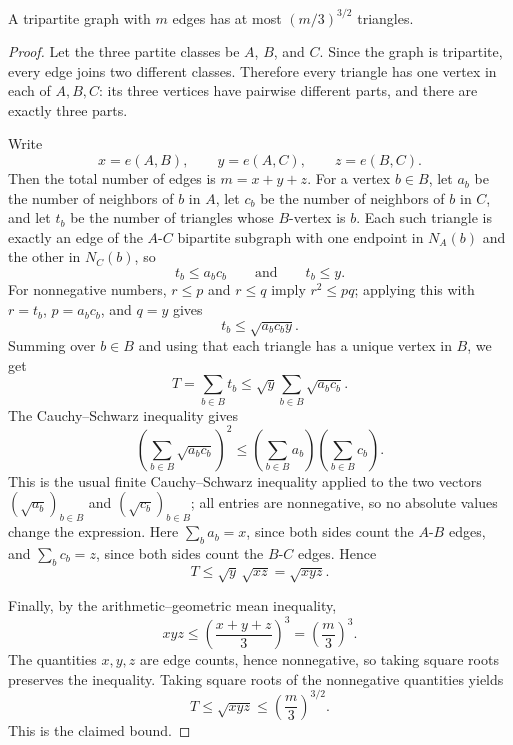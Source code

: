 \begin{lemma}
A tripartite graph with $m$ edges has at most $(m/3)^{3/2}$ triangles.
\end{lemma}
\begin{proof}
Let the three partite classes be $A$, $B$, and $C$.  Since the graph is
tripartite, every edge joins two different classes.  Therefore every triangle
has one vertex in each of $A,B,C$: its three vertices have pairwise different
parts, and there are exactly three parts.

Write
\[
x=e(A,B),\qquad y=e(A,C),\qquad z=e(B,C).
\]
Then the total number of edges is $m=x+y+z$.  For a vertex $b\in B$, let
$a_b$ be the number of neighbors of $b$ in $A$, let $c_b$ be the number of
neighbors of $b$ in $C$, and let $t_b$ be the number of triangles whose
$B$-vertex is $b$.  Each such triangle is exactly an edge of the
$A$-$C$ bipartite subgraph with one endpoint in $N_A(b)$ and the other in
$N_C(b)$, so
\[
t_b\le a_b c_b
\qquad\text{and}\qquad
t_b\le y.
\]
For nonnegative numbers, $r\le p$ and $r\le q$ imply
$r^2\le pq$; applying this with $r=t_b$, $p=a_bc_b$, and $q=y$ gives
\[
t_b\le \sqrt{a_b c_b y}.
\]
Summing over $b\in B$ and using that each triangle has a unique vertex in
$B$, we get
\[
T=\sum_{b\in B}t_b
\le \sqrt y\sum_{b\in B}\sqrt{a_b c_b}.
\]
The Cauchy--Schwarz inequality gives
\[
\left(\sum_{b\in B}\sqrt{a_b c_b}\right)^2
\le
\left(\sum_{b\in B}a_b\right)
\left(\sum_{b\in B}c_b\right).
\]
This is the usual finite Cauchy--Schwarz inequality applied to the two
vectors $(\sqrt{a_b})_{b\in B}$ and $(\sqrt{c_b})_{b\in B}$; all entries are
nonnegative, so no absolute values change the expression.
Here $\sum_b a_b=x$, since both sides count the $A$-$B$ edges, and
$\sum_b c_b=z$, since both sides count the $B$-$C$ edges.  Hence
\[
T\le \sqrt y\,\sqrt{xz}=\sqrt{xyz}.
\]

Finally, by the arithmetic--geometric mean inequality,
\[
xyz\le \left(\frac{x+y+z}{3}\right)^3=\left(\frac m3\right)^3.
\]
The quantities $x,y,z$ are edge counts, hence nonnegative, so taking square
roots preserves the inequality.
Taking square roots of the nonnegative quantities yields
\[
T\le \sqrt{xyz}\le \left(\frac m3\right)^{3/2}.
\]
This is the claimed bound.
\end{proof}
